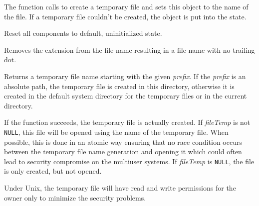 The function calls  to
create a temporary file and sets this object to the name of the file. If a
temporary file couldn't be created, the object is put into the\rtfsp
{} state.


\label{wxfilenameclear}


Reset all components to default, uninitialized state.


\label{wxfilenameclearext}


Removes the extension from the file name resulting in a 
file name with no trailing dot.



\label{wxfilenamecreatetempfilename}


Returns a temporary file name starting with the given {\it prefix}. If
the {\it prefix} is an absolute path, the temporary file is created in this
directory, otherwise it is created in the default system directory for the
temporary files or in the current directory.

If the function succeeds, the temporary file is actually created. If\rtfsp
{\it fileTemp} is not {\tt NULL}, this file will be opened using the name of
the temporary file. When possible, this is done in an atomic way ensuring that
no race condition occurs between the temporary file name generation and opening
it which could often lead to security compromise on the multiuser systems.
If {\it fileTemp} is {\tt NULL}, the file is only created, but not opened.

Under Unix, the temporary file will have read and write permissions for the
owner only to minimize the security problems.




